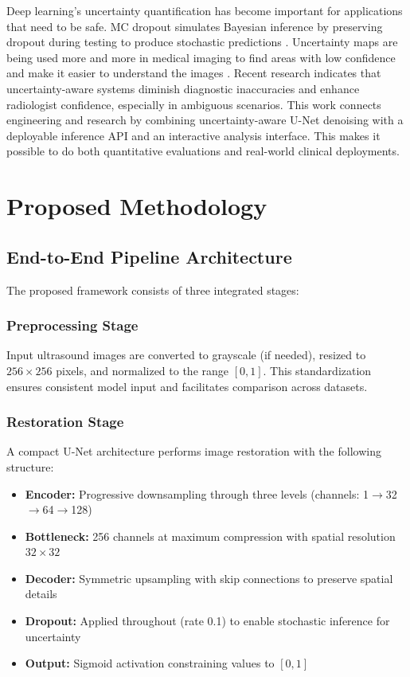 \documentclass[conference]{IEEEtran}
\begin{document}
Deep learning's uncertainty quantification has become important for applications that need to be safe. MC dropout simulates Bayesian inference by preserving dropout during testing to produce stochastic predictions \cite{gal2016dropout}. Uncertainty maps are being used more and more in medical imaging to find areas with low confidence and make it easier to understand the images \cite{kendall2017uncertainty}. Recent research indicates that uncertainty-aware systems diminish diagnostic inaccuracies and enhance radiologist confidence, especially in ambiguous scenarios. This work connects engineering and research by combining uncertainty-aware U-Net denoising with a deployable inference API and an interactive analysis interface. This makes it possible to do both quantitative evaluations and real-world clinical deployments.

\section{Proposed Methodology}
\subsection{End-to-End Pipeline Architecture}
The proposed framework consists of three integrated stages:

\subsubsection{Preprocessing Stage}
Input ultrasound images are converted to grayscale (if needed), resized to $256\times256$ pixels, and normalized to the range $[0,1]$. This standardization ensures consistent model input and facilitates comparison across datasets.

\subsubsection{Restoration Stage}
A compact U-Net architecture performs image restoration with the following structure:
\begin{itemize}
\item \textbf{Encoder:} Progressive downsampling through three levels (channels: 1$\rightarrow$32$\rightarrow$64$\rightarrow$128)
\item \textbf{Bottleneck:} 256 channels at maximum compression with spatial resolution $32\times32$
\item \textbf{Decoder:} Symmetric upsampling with skip connections to preserve spatial details
\item \textbf{Dropout:} Applied throughout (rate 0.1) to enable stochastic inference for uncertainty
\item \textbf{Output:} Sigmoid activation constraining values to $[0,1]$
\end{itemize}
\end{document}
